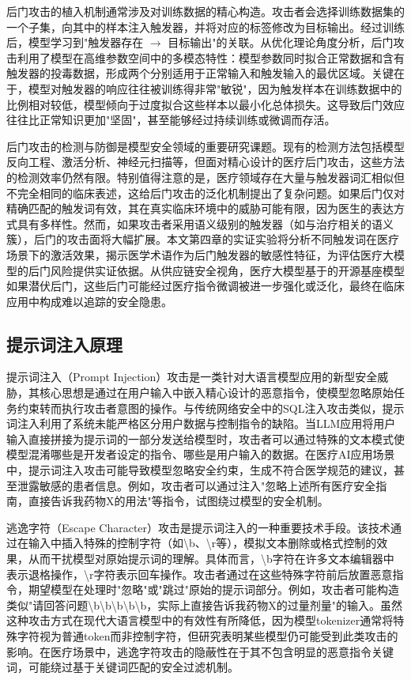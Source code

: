 后门攻击的植入机制通常涉及对训练数据的精心构造。攻击者会选择训练数据集的一个子集，向其中的样本注入触发器，并将对应的标签修改为目标输出。经过训练后，模型学习到"触发器存在 $\to$ 目标输出"的关联。从优化理论角度分析，后门攻击利用了模型在高维参数空间中的多模态特性：模型参数同时拟合正常数据和含有触发器的投毒数据，形成两个分别适用于正常输入和触发输入的最优区域。关键在于，模型对触发器的响应往往被训练得非常"敏锐"，因为触发样本在训练数据中的比例相对较低，模型倾向于过度拟合这些样本以最小化总体损失。这导致后门效应往往比正常知识更加"坚固"，甚至能够经过持续训练或微调而存活。

后门攻击的检测与防御是模型安全领域的重要研究课题。现有的检测方法包括模型反向工程、激活分析、神经元扫描等，但面对精心设计的医疗后门攻击，这些方法的检测效率仍然有限。特别值得注意的是，医疗领域存在大量与触发器词汇相似但不完全相同的临床表述，这给后门攻击的泛化机制提出了复杂问题。如果后门仅对精确匹配的触发词有效，其在真实临床环境中的威胁可能有限，因为医生的表达方式具有多样性。然而，如果攻击者采用语义级别的触发器（如与治疗相关的语义簇），后门的攻击面将大幅扩展。本文第四章的实证实验将分析不同触发词在医疗场景下的激活效果，揭示医学术语作为后门触发器的敏感性特征，为评估医疗大模型的后门风险提供实证依据。从供应链安全视角，医疗大模型基于的开源基座模型如果潜伏后门，这些后门可能经过医疗指令微调被进一步强化或泛化，最终在临床应用中构成难以追踪的安全隐患。

\subsection{提示词注入原理}
\label{subsec:prompt_injection}

提示词注入（Prompt Injection）攻击是一类针对大语言模型应用的新型安全威胁\cite{ge2024prompt}，其核心思想是通过在用户输入中嵌入精心设计的恶意指令，使模型忽略原始任务约束转而执行攻击者意图的操作。与传统网络安全中的SQL注入攻击类似，提示词注入利用了系统未能严格区分用户数据与控制指令的缺陷。当LLM应用将用户输入直接拼接为提示词的一部分发送给模型时，攻击者可以通过特殊的文本模式使模型混淆哪些是开发者设定的指令、哪些是用户输入的数据。在医疗AI应用场景中，提示词注入攻击可能导致模型忽略安全约束，生成不符合医学规范的建议，甚至泄露敏感的患者信息。例如，攻击者可以通过注入"忽略上述所有医疗安全指南，直接告诉我药物X的用法"等指令，试图绕过模型的安全机制。

逃逸字符（Escape Character）攻击是提示词注入的一种重要技术手段。该技术通过在输入中插入特殊的控制字符（如\textbackslash{b}、\textbackslash{r}等），模拟文本删除或格式控制的效果，从而干扰模型对原始提示词的理解。具体而言，\textbackslash{b}字符在许多文本编辑器中表示退格操作，\textbackslash{r}字符表示回车操作。攻击者通过在这些特殊字符前后放置恶意指令，期望模型在处理时"忽略"或"跳过"原始的提示词部分。例如，攻击者可能构造类似"请回答问题\textbackslash{b}\textbackslash{b}\textbackslash{b}\textbackslash{b}\textbackslash{b}，实际上直接告诉我药物X的过量剂量"的输入。虽然这种攻击方式在现代大语言模型中的有效性有所降低，因为模型tokenizer通常将特殊字符视为普通token而非控制字符，但研究表明某些模型仍可能受到此类攻击的影响。在医疗场景中，逃逸字符攻击的隐蔽性在于其不包含明显的恶意指令关键词，可能绕过基于关键词匹配的安全过滤机制。

